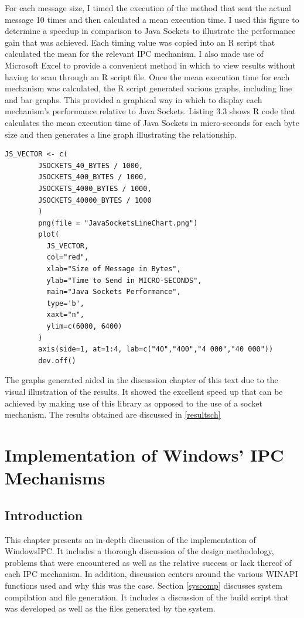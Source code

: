 \documentclass[12pt] {newrucsthesis}    %
\begin{document}
      For each message size, I timed the execution of the method that sent the actual message 10 times and then calculated a mean execution time. I
      used this figure to determine a speedup in comparison to Java Sockets to illustrate the performance gain
      that was achieved. Each timing value was copied into an R script that calculated the mean for the relevant IPC mechanism.
      I also made use of Microsoft Excel to provide a convenient method in which to view results without having to scan through an
      R script file. Once the mean execution time for each mechanism was calculated, the R script generated various graphs, including line and
      bar graphs. This provided a graphical way in which to display each mechanism's performance relative to Java Sockets. Listing 3.3 shows R
      code that calculates the mean execution time of Java Sockets in micro-seconds for each byte size and then generates a line graph
      illustrating the relationship.

      \begin {lstlisting}[caption=Snippet of R Script that Generates Stats and Graphs]
        JS_VECTOR <- c(
        JSOCKETS_40_BYTES / 1000,
        JSOCKETS_400_BYTES / 1000,
        JSOCKETS_4000_BYTES / 1000,
        JSOCKETS_40000_BYTES / 1000
        )
        png(file = "JavaSocketsLineChart.png")
        plot(
          JS_VECTOR,
          col="red",
          xlab="Size of Message in Bytes",
          ylab="Time to Send in MICRO-SECONDS",
          main="Java Sockets Performance",
          type='b',
          xaxt="n",
          ylim=c(6000, 6400)
        )
        axis(side=1, at=1:4, lab=c("40","400","4 000","40 000"))
        dev.off()
      \end{lstlisting}

      The graphs generated aided in the discussion chapter of this text due to the visual illustration of the results.
      It showed the excellent speed up that can be achieved by making use of this library as opposed to the use of a
      socket mechanism. The results obtained are discussed in \ref{resultsch}



  \chapter{Implementation of Windows' IPC Mechanisms}
    \section{Introduction}
      This chapter presents an in-depth discussion of the implementation of WindowsIPC. It includes a thorough
      discussion of the design methodology, problems that were encountered as well as the relative success or lack
      thereof of each IPC mechanism. In addition, discussion centers around the various WINAPI functions used and
      why this was the case. Section \ref{syscomp} discusses system compilation and file generation. It includes
      a discussion of the build script that was developed as well as the files generated by the system.
\end{document}

